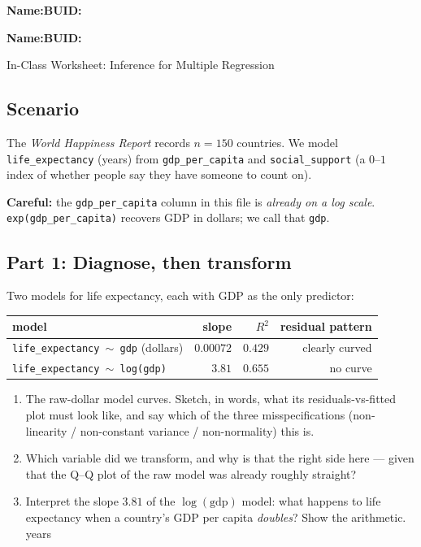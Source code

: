 \documentclass{article}
\newcommand{\blankline}[1]{\underline{\hspace{#1}}}
\begin{document}
\noindent\textbf{Name:}\blankline{2.25in}\hfill\textbf{BUID:}\blankline{1.55in}

\medskip

\noindent\textbf{Name:}\blankline{2.25in}\hfill\textbf{BUID:}\blankline{1.55in}\newline

\begin{center}
 \Large In-Class Worksheet: Inference for Multiple Regression
\end{center}

\subsection*{Scenario}
The \emph{World Happiness Report} records $n = 150$ countries. We model \texttt{life\_expectancy} (years) from \texttt{gdp\_per\_capita} and \texttt{social\_support} (a $0$--$1$ index of whether people say they have someone to count on).

\smallskip
\textbf{Careful:} the \texttt{gdp\_per\_capita} column in this file is \emph{already on a log scale}. \texttt{exp(gdp\_per\_capita)} recovers GDP in dollars; we call that \texttt{gdp}.

\newpage

\subsection*{Part 1: Diagnose, then transform}

Two models for life expectancy, each with GDP as the only predictor:

\begin{center}
\renewcommand{\arraystretch}{1.3}
\begin{tabular}{lrrr}
\toprule
model & slope & $R^2$ & residual pattern \\
\midrule
\texttt{life\_expectancy $\sim$ gdp} (dollars)   & $0.00072$ & $0.429$ & clearly curved \\
\texttt{life\_expectancy $\sim$ log(gdp)}        & $3.81$    & $0.655$ & no curve \\
\bottomrule
\end{tabular}
\end{center}

\begin{enumerate}[label={\bfseries (\Alph*)},itemsep=.8em]
\item The raw-dollar model curves. Sketch, in words, what its residuals-vs-fitted plot must look like, and say which of the three misspecifications (non-linearity / non-constant variance / non-normality) this is. \\[3.5em]
\item Which variable did we transform, and why is that the right side here --- given that the Q--Q plot of the raw model was already roughly straight? \\[3.5em]
\item Interpret the slope $3.81$ of the $\log(\text{gdp})$ model: what happens to life expectancy when a country's GDP per capita \emph{doubles}? Show the arithmetic. \hfill \blankline{1.4in} years \\[2em]
\end{enumerate}
\end{document}
